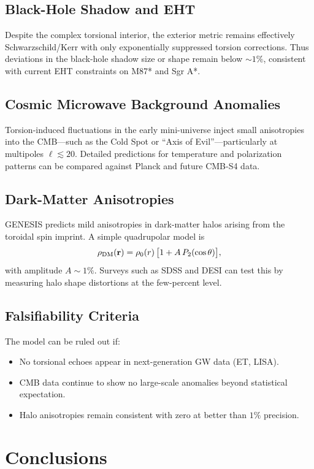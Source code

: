\documentclass{article}
\begin{document}
\subsection{Black-Hole Shadow and EHT}
Despite the complex torsional interior, the exterior metric remains effectively Schwarzschild/Kerr with only exponentially suppressed torsion corrections.  Thus deviations in the black-hole shadow size or shape remain below \(\sim1\%\), consistent with current EHT constraints on M87* and Sgr A*.

\subsection{Cosmic Microwave Background Anomalies}
Torsion-induced fluctuations in the early mini-universe inject small anisotropies into the CMB—such as the Cold Spot or “Axis of Evil”—particularly at multipoles \(\ell\lesssim20\).  Detailed predictions for temperature and polarization patterns can be compared against Planck and future CMB-S4 data.

\subsection{Dark-Matter Anisotropies}
GENESIS predicts mild anisotropies in dark-matter halos arising from the toroidal spin imprint.  A simple quadrupolar model is
\[
  \rho_{\rm DM}(\mathbf r)
  = \rho_0(r)\,\bigl[1 + A\,P_2(\cos\theta)\bigr],
\]
with amplitude \(A\sim1\%\).  Surveys such as SDSS and DESI can test this by measuring halo shape distortions at the few-percent level.

\subsection{Falsifiability Criteria}
The model can be ruled out if:
\begin{itemize}
  \item No torsional echoes appear in next-generation GW data (ET, LISA).  
  \item CMB data continue to show no large-scale anomalies beyond statistical expectation.  
  \item Halo anisotropies remain consistent with zero at better than \(1\%\) precision.  
\end{itemize}

\section{Conclusions}
\label{sec:conclusions}
\end{document}
